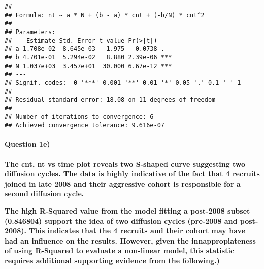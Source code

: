 \documentclass[]{article}
\newenvironment{Shaded}{\begin{snugshade}}{\end{snugshade}}
\newcommand{\CommentTok}[1]{\textcolor[rgb]{0.56,0.35,0.01}{\textit{#1}}}
\newcommand{\DecValTok}[1]{\textcolor[rgb]{0.00,0.00,0.81}{#1}}
\newcommand{\KeywordTok}[1]{\textcolor[rgb]{0.13,0.29,0.53}{\textbf{#1}}}
\newcommand{\NormalTok}[1]{#1}
\newcommand{\OperatorTok}[1]{\textcolor[rgb]{0.81,0.36,0.00}{\textbf{#1}}}
\newcommand{\StringTok}[1]{\textcolor[rgb]{0.31,0.60,0.02}{#1}}
\let\oldparagraph\paragraph
\renewcommand{\paragraph}[1]{\oldparagraph{#1}\mbox{}}
\begin{document}
\begin{verbatim}
## 
## Formula: nt ~ a * N + (b - a) * cnt + (-b/N) * cnt^2
## 
## Parameters:
##    Estimate Std. Error t value Pr(>|t|)    
## a 1.708e-02  8.645e-03   1.975   0.0738 .  
## b 4.701e-01  5.294e-02   8.880 2.39e-06 ***
## N 1.037e+03  3.457e+01  30.000 6.67e-12 ***
## ---
## Signif. codes:  0 '***' 0.001 '**' 0.01 '*' 0.05 '.' 0.1 ' ' 1
## 
## Residual standard error: 18.08 on 11 degrees of freedom
## 
## Number of iterations to convergence: 6 
## Achieved convergence tolerance: 9.616e-07
\end{verbatim}

\begin{Shaded}
\end{Shaded}

\hypertarget{question-1e}{%
\paragraph{Question 1e)}\label{question-1e}}

\textbf{The cnt, nt vs time plot reveals two S-shaped curve suggesting
two diffusion cycles. The data is highly indicative of the fact that 4
recruits joined in late 2008 and their aggressive cohort is responsible
for a second diffusion cycle.}

\textbf{The high R-Squared value from the model fitting a post-2008
subset (0.846804) support the idea of two diffusion cycles (pre-2008 and
post-2008). This indicates that the 4 recruits and their cohort may have
had an influence on the results. However, given the innappropiateness of
using R-Squared to evaluate a non-linear model, this statistic requires
additional supporting evidence from the following.)}
\end{document}
